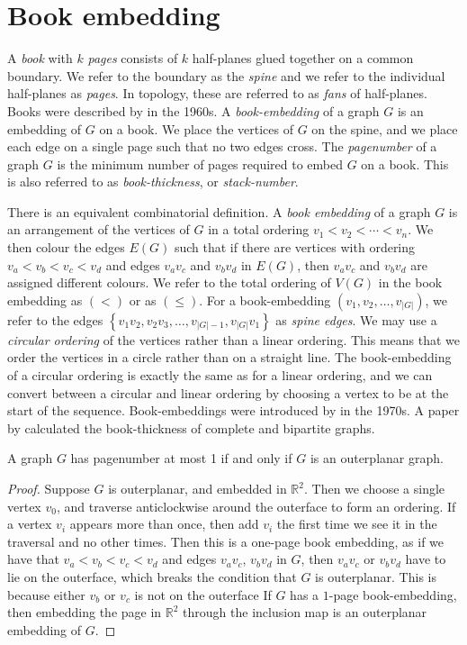 \section{Book embedding}\label{sec:Book Embedding}
A \textit{book} with \(k\) \textit{pages} consists of \(k\) half-planes glued together on a common boundary. We refer to the boundary as the \textit{spine} and we refer to the individual half-planes as \textit{pages}. In topology, these are referred to as \textit{fans} of half-planes. Books were described by \textcite{persingerSubsetsNbooksE31966,atneosenOnedimensionalNleavedContinua1972} in the 1960s.
A \textit{book-embedding} of a graph \(G\) is an embedding of \(G\) on a book. We place the vertices of \(G\) on the spine, and we place each edge on a single page such that no two edges cross.
The \textit{pagenumber} of a graph \(G\) is the minimum number of pages required to embed \(G\) on a book. This is also referred to as \textit{book-thickness}, or \textit{stack-number}.
\par
There is an equivalent combinatorial definition. A \textit{book embedding} of a graph \(G\) is an arrangement of the vertices of \(G\) in a total ordering \(v_1 < v_2 < \cdots < v_n\). We then colour the edges \(E(G)\) such that if there are vertices with ordering \(v_a < v_b < v_c < v_d\) and edges \(v_a v_c\) and \(v_b v_d\) in $E(G)$, then $v_a v_c$ and $v_b v_d$ are assigned different colours.
We refer to the total ordering of \(V(G)\) in the book embedding as \((<)\) or as \((\leq)\). For a book-embedding \((v_1, v_2, \ldots, v_{|G|})\), we refer to the edges \( \left\{ v_1 v_2, v_2 v_3, \ldots, v_{|G| - 1}, v_{|G|}v_{1} \right\} \) as \textit{spine edges}.
We may use a \textit{circular ordering} of the vertices rather than a linear ordering. This means that we order the vertices in a circle rather than on a straight line. The book-embedding of a circular ordering is exactly the same as for a linear ordering, and we can convert between a circular and linear ordering by choosing a vertex to be at the start of the sequence.
Book-embeddings were introduced by \textcite{kainenRecentResultsTopological1974, ollmannBookThicknessVarious1973} in the 1970s. A paper by \textcite{bernhartBookThicknessGraph1979} calculated the book-thickness of complete and bipartite graphs.
\begin{lemma}\label{lem:Pagenumber_1}
	A graph \(G\) has pagenumber at most 1 if and only if \(G\) is an outerplanar graph.
\end{lemma}
\begin{proof}
	Suppose $G$ is outerplanar, and embedded in $\mathbb{R}^2$. Then we choose a single vertex $v_0$, and traverse anticlockwise around the outerface to form an ordering. If a vertex $v_i$ appears more than once, then add $v_i$ the first time we see it in the traversal and no other times. Then this is a one-page book embedding, as if we have that $v_a < v_b < v_c < v_d$ and edges $v_a v_c$, $v_b v_d$ in $G$, then $v_a v_c$ or $v_b v_d$ have to lie on the outerface, which breaks the condition that $G$ is outerplanar. This is because either $v_b$ or $v_c$ is not on the outerface If $G$ has a $1$-page book-embedding, then embedding the page in $\mathbb{R}^2$ through the inclusion map is an outerplanar embedding of $G$. 
\end{proof}
